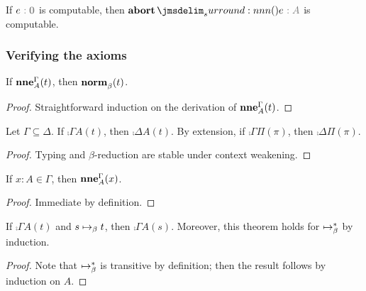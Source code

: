 \documentclass[a4paper]{article}
\begin{document}
\begin{observation}\label{thm:0005}
  If $e\tpAnno{\tpEmp}$ is computable, then $\tmAbort{e}\tpAnno{A}$ is computable.
\end{observation}

\subsubsection{Verifying the axioms}
\label{sec:0009}

\begin{lemma}\label{thm:0002}
  If $\operatorname{\mathbf{nne}}^{\Gamma}_{A}(t)$, then $\operatorname{\mathbf{norm}}^{}_{\beta}(t)$.
\end{lemma}
\begin{proof}
  Straightforward induction on the derivation of $\operatorname{\mathbf{nne}}^{\Gamma}_{A}(t)$.
\end{proof}

\begin{lemma}\label{thm:1001}
  Let $\Gamma \subseteq \Delta$.
  If $\comp{\Gamma}{A}(t)$, then $\comp{\Delta}{A}(t)$.
  By extension, if $\comp{\Gamma}{\Pi}(\pi)$, then $\comp{\Delta}{\Pi}(\pi)$.
\end{lemma}
\begin{proof}
  Typing and $\beta$-reduction are stable under context weakening.
\end{proof}

\begin{theorem}[\cref{ax:0002}]\label{thm:0003}
  If $x : A \in \Gamma$, then $\operatorname{\mathbf{nne}}^{\Gamma}_{A}(x)$.
\end{theorem}
\begin{proof}
  Immediate by definition.
\end{proof}

\begin{theorem}[\cref{ax:0003}]\label{thm:1010}
  If $\comp{\Gamma}{A}(t)$ and $s \bRed t$, then $\comp{\Gamma}{A}(s)$.
  Moreover, this theorem holds for $\bRed*$ by induction.
\end{theorem}
\begin{proof}
  Note that $\bRed*$ is transitive by definition; then the result follows by induction on $A$.
\end{proof}
\end{document}
